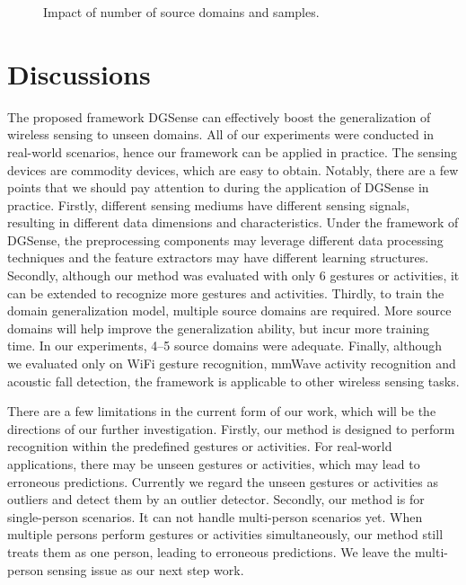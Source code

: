 \documentclass[journal]{IEEEtran}
\begin{document}
\begin{figure*}
\begin{center}
\hspace{0.5cm}
\hspace{0.5cm}
\end{center}
\caption{Impact of number of source domains and samples.}
\label{FigParameter}
\end{figure*}


\section{Discussions}
\label{SecDiscussions}

The proposed framework DGSense can effectively boost the generalization of wireless sensing to unseen domains. All of our experiments were conducted in real-world scenarios, hence our framework can be applied in practice. The sensing devices are commodity devices, which are easy to obtain. Notably, there are a few points that we should pay attention to during the application of DGSense in practice. Firstly, different sensing mediums have different sensing signals, resulting in different data dimensions and characteristics. Under the framework of DGSense, the preprocessing components may leverage different data processing techniques and the feature extractors may have different learning structures. Secondly, although our method was evaluated with only 6 gestures or activities, it can be extended to recognize more gestures and activities. Thirdly, to train the domain generalization model, multiple source domains are required. More source domains will help improve the generalization ability, but incur more training time. In our experiments, 4--5 source domains were adequate. Finally, although we evaluated only on WiFi gesture recognition, mmWave activity recognition and acoustic fall detection, the framework is applicable to other wireless sensing tasks. 

There are a few limitations in the current form of our work, which will be the directions of our further investigation. Firstly, our method is designed to perform recognition within the predefined gestures or activities. For real-world applications, there may be unseen gestures or activities, which may lead to erroneous predictions. Currently we regard the unseen gestures or activities as outliers and detect them by an outlier detector. Secondly, our method is for single-person scenarios. It can not handle multi-person scenarios yet. When multiple persons perform gestures or activities simultaneously, our method still treats them as one person, leading to erroneous predictions. We leave the multi-person sensing issue as our next step work. 
\end{document}
